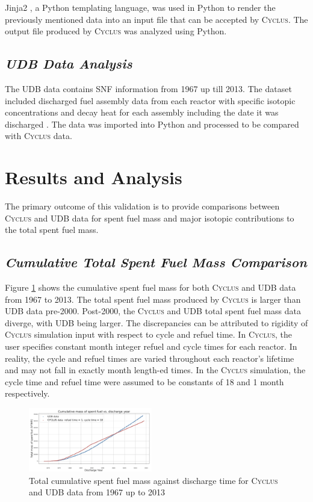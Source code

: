 \documentclass{anstrans}
\newcommand{\Cyclus}{\textsc{Cyclus}\xspace}%
\begin{document}
Jinja2 \cite{Ronacher_Jinja2_2018}, a Python templating language, was used in Python to render the previously mentioned data into an input file that can be accepted by \Cyclus. The output file produced by \Cyclus was analyzed using Python. 

\subsection{\textit{UDB Data Analysis}}
The UDB data contains SNF information from 1967 up till 2013. The dataset included discharged fuel assembly data from each reactor with specific isotopic concentrations and decay heat for each assembly including the date it was discharged \cite{Peterson_UNF_2017}. The data was imported into Python and processed to be compared with \Cyclus data. 
\section{Results and Analysis}
The primary outcome of this validation is to provide comparisons between \Cyclus and UDB data for spent fuel mass and major isotopic contributions to the total spent fuel mass. 

\subsection{\textit{Cumulative Total Spent Fuel Mass Comparison}}
Figure \ref{fig:total_original} shows the cumulative spent fuel mass for both \Cyclus and UDB data from 1967 to 2013. The total spent fuel mass produced by \Cyclus is larger than UDB data pre-2000. Post-2000, the \Cyclus and UDB total spent fuel mass data diverge, with UDB being larger. The discrepancies can be attributed to rigidity of \Cyclus simulation input with respect to cycle and refuel time. In \Cyclus, the user specifies constant month integer refuel and cycle times for each reactor. In reality, the cycle and refuel times are varied throughout each reactor's lifetime and may not fall in exactly month length-ed times. In the \Cyclus simulation, the cycle time and refuel time were assumed to be constants of 18 and 1 month respectively.   

\begin{figure}[ht] %
	\centering
	\includegraphics[width=0.48\textwidth]{total_cumulative_mass_spent_fuel_original}
	\caption{Total cumulative spent fuel mass against discharge time for \Cyclus and UDB data from 1967 up to 2013}
	\label{fig:total_original}
\end{figure}
\end{document}
